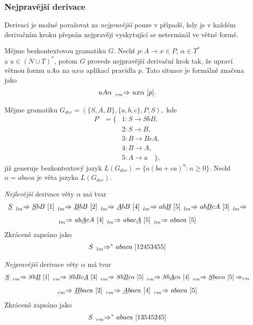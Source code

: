 \subsubsection{Nejpravější derivace}
Derivaci je možné považovat za \emph{nejpravější} pouze v případě, kdy je v každém derivačním kroku přepsán nejpravěji vyskytující se neterminál ve větné formě.
\begin{definice}
  Mějme bezkontextovou gramatiku $G$. Nechť $p\!: A \rightarrow x \in P$, $\alpha \in T^*$ \\ a $u \in (N \cup T)^*$, potom $G$ provede nejpravější derivační krok
  tak, že upraví větnou formu $uA\alpha$ na $ux\alpha$ aplikací pravidla $p$. Tato situace je formálně značena jako
  $$uA\alpha\ \prescript{}{rm}{\Rightarrow}\ ux\alpha\ [p].$$
\end{definice}

\begin{priklad}
  Mějme gramatiku $G_{der} = (\{S, A, B\}, \{a, b, c\}, P, S),$ kde
  \begin{eqnarray*}
    P & = \{ & 1\!: S \rightarrow S b B, \\
      &      & 2\!: S \rightarrow B, \\
      &      & 3\!: B \rightarrow B c A, \\
      &      & 4\!: B \rightarrow A, \\
      &      & 5\!: A \rightarrow a\quad\},
  \end{eqnarray*}
  již generuje bezkontextový jazyk $L(G_{der}) = \{a(ba + ca)^n\!: n \geq 0\}$. Nechť $\alpha = abaca$ je věta jazyka $L(G_{der})$.

  \emph{Nejlevější} derivace věty $\alpha$ má tvar
  $$\underline{S}\ \prescript{}{lm}{\Rightarrow}\ \underline{S}bB\ [1]\ \prescript{}{lm}{\Rightarrow}\ \underline{B}bB\ [2]\ \prescript{}{lm}{\Rightarrow}\ \underline{A}bB\ [4]\ \prescript{}{lm}{\Rightarrow}\ ab\underline{B}\ [5]\ \prescript{}{lm}{\Rightarrow}\ ab\underline{B}cA\ [3]\ \prescript{}{lm}{\Rightarrow}$$
  $$\prescript{}{lm}{\Rightarrow}\ ab\underline{A}cA\ [4]\ \prescript{}{lm}{\Rightarrow}\ abac\underline{A}\ [5]\ \prescript{}{lm}{\Rightarrow}\ abaca\ [5]$$
  Zkráceně zapsáno jako
  $$S\ \prescript{}{lm}{\Rightarrow}^*\ abaca\ [12453455]$$

  \emph{Nejpravější} derivace věty $\alpha$ má tvar
  $$\underline{S}\ \prescript{}{rm}{\Rightarrow}\ Sb\underline{B}\ [1]\ \prescript{}{rm}{\Rightarrow}\ SbBc\underline{A}\ [3]\ \prescript{}{rm}{\Rightarrow}\ Sb\underline{B}ca\ [5]\ \prescript{}{rm}{\Rightarrow}\ Sb\underline{A}ca\ [4]\ \prescript{}{rm}{\Rightarrow}\ \underline{S}baca\ [5] \Rightarrow_{rm}$$
  $$\prescript{}{rm}{\Rightarrow}\ \underline{B}baca\ [2]\ \prescript{}{rm}{\Rightarrow}\ \underline{A}baca\ [4]\ \prescript{}{rm}{\Rightarrow}\ abaca\ [5]$$
  Zkráceně zapsáno jako
  $$S\ \prescript{}{rm}{\Rightarrow}^*\ abaca\ [13545245]$$

\end{priklad}


